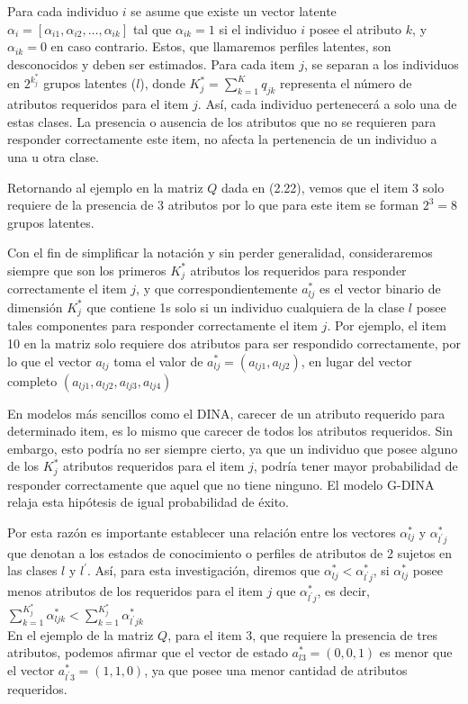 				Para cada individuo $i$ se asume que existe un vector latente ${ \alpha  }_{ i }=\left[ { \alpha  }_{ i1 },{ \alpha  }_{ i2 },\ldots ,{ \alpha  }_{ ik } \right]$ tal que $\alpha_{i k}=1$ si el individuo $i$ posee el atributo $k$, y $\alpha_{i k}=0$ en caso contrario. Estos, que llamaremos perfiles latentes, son desconocidos y deben ser estimados.
				Para cada item $j$, se separan a los individuos en  $2^{k_{j}^{*}}$ grupos latentes ($l$), donde ${K}_{ j }^{ * }=\sum _{ k=1 }^{ K }{ { q }_{ jk }}$ representa el n\'{u}mero de atributos requeridos para el item $j$. As\'{i}, cada individuo pertenecer\'{a} a solo una de estas clases. La presencia o ausencia de los atributos que no se requieren para responder correctamente este item, no afecta la pertenencia de un individuo a una u otra clase.
				
				Retornando al ejemplo en la matriz $Q$ dada en (2.22), vemos que el item 3 solo requiere de la presencia de 3 atributos por lo que para este item se forman ${2}^{3}=8$ grupos latentes.\
				
				Con el fin de simplificar la notaci\'{o}n y sin perder generalidad, consideraremos siempre que son los primeros ${K}_{ j }^{*}$ atributos los requeridos para responder correctamente el item $j$, y que correspondientemente ${a}_{ lj }^{ * }$ es el vector binario de dimensi\'{o}n ${ K }_{ j }^{ * }$ que contiene 1s solo si un individuo cualquiera de la clase $l$ posee tales componentes para responder correctamente el item $j$. Por ejemplo, el item 10 en la matriz solo requiere dos atributos para ser respondido correctamente, por lo que el vector ${ a }_{ lj }$ toma el valor de ${ a }_{ lj }^{ * }=\left( { a }_{ lj1 },{ a }_{ lj2 } \right)$, en lugar del vector completo $\left( { a }_{ lj1 },{ a }_{ lj2 },{ a }_{ lj3 },{ a }_{ lj4 } \right)$
				
				En modelos m\'{a}s sencillos como el DINA, carecer de un atributo requerido para determinado item, es lo mismo que carecer de todos los atributos requeridos. Sin embargo, esto podr\'{i}a no ser siempre cierto, ya que un individuo que posee alguno de los ${K }_{ j }^{ * }$ atributos requeridos para el item $j$, podr\'{i}a tener mayor probabilidad de responder correctamente que aquel que no tiene ninguno. El modelo G-DINA relaja esta hip\'{o}tesis de igual probabilidad de \'{e}xito.
				
				Por esta raz\'{o}n es importante establecer una relaci\'{o}n entre los vectores $\alpha_{l j}^{*}$ y $\alpha_{l^{\prime} j}^{*}$ que denotan a los estados de conocimiento o perfiles de atributos de 2 sujetos en las clases $l$ y ${ l }^{ \prime  }$. As\'{i}, para esta investigaci\'{o}n, diremos que $\alpha_{l j}^{*}<\alpha_{l^{\prime} j}^{*}$, si $\alpha_{l j}^{*}$ posee menos atributos de los requeridos para el item $j$ que $\alpha_{l^{\prime} j}^{*}$, es decir, $\sum_{k=1}^{K_{j}^{*}} \alpha_{l j k}^{*}<\sum_{k=1}^{K_{j}^{*}} \alpha_{l^{\prime} j k}^{*}$\\ 
				En el ejemplo de la matriz $Q$, para el item 3, que requiere la presencia de tres atributos, podemos afirmar que el vector de estado $a_{ l3 }^{ * }=(0,0,1)$ es menor que el vector $a_{l^{\prime}3 }^{ * }=(1,1,0)$, ya que posee una menor cantidad de atributos requeridos.
				
